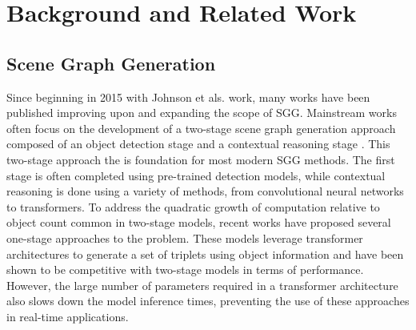 \documentclass{article}
\begin{document}
\section{Background and Related Work}
\subsection*{Scene Graph Generation}
Since beginning in 2015 with Johnson et als. work\cite{johnson2015image}, many works have been published improving upon and expanding the scope of SGG\cite{cong2023reltr,desai2021learning,yang2018graph,li2021bipartite,jung2023devil,li2022sgtr,plummer2020revisiting,jin2023fast,lee2018multi,dornadula2019visual,gu2019scene,tripathi2019using,liang2017deep,tang2020unbiased,chiou2021recovering,yan2020pcpl}. Mainstream works often focus on the development of a two-stage scene graph generation approach composed of an object detection stage and a contextual reasoning stage \cite{yang2018graph,jung2023devil}. This two-stage approach the is foundation for most modern SGG methods\cite{yang2018graph,desai2021learning,li2021bipartite,dornadula2019visual,gu2019scene}.
The first stage is often completed using pre-trained detection models\cite{carion2020end}, while contextual reasoning is done using a variety of methods, from convolutional neural networks\cite{yang2018graph} to transformers\cite{cong2023reltr}. To address the quadratic growth of computation relative to object count common in two-stage models, recent works have proposed several one-stage approaches to the problem\cite{cong2023reltr,li2022sgtr}. These models leverage transformer architectures to generate a set of triplets using object information and have been shown to be competitive with two-stage models in terms of performance. However, the large number of parameters required in a transformer architecture also slows down the model inference times, preventing the use of these approaches in real-time applications\cite{cong2023reltr,liang2017deep}.
\end{document}
